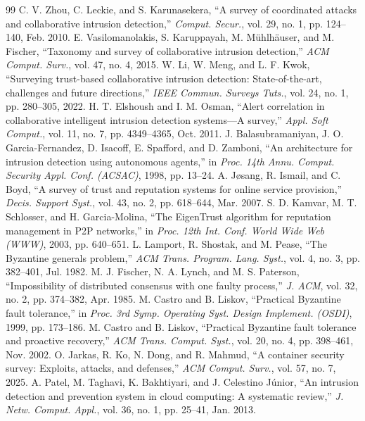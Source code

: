 \documentclass[journal]{IEEEtran}
\begin{document}
\begin{thebibliography}{99}
 C. V. Zhou, C. Leckie, and S. Karunasekera, ``A survey of coordinated attacks and collaborative intrusion detection,'' \emph{Comput. Secur.}, vol. 29, no. 1, pp. 124--140, Feb. 2010.
 E. Vasilomanolakis, S. Karuppayah, M. M{\"u}hlh{\"a}user, and M. Fischer, ``Taxonomy and survey of collaborative intrusion detection,'' \emph{ACM Comput. Surv.}, vol. 47, no. 4, 2015.
 W. Li, W. Meng, and L. F. Kwok, ``Surveying trust-based collaborative intrusion detection: State-of-the-art, challenges and future directions,'' \emph{IEEE Commun. Surveys Tuts.}, vol. 24, no. 1, pp. 280--305, 2022.
 H. T. Elshoush and I. M. Osman, ``Alert correlation in collaborative intelligent intrusion detection systems---A survey,'' \emph{Appl. Soft Comput.}, vol. 11, no. 7, pp. 4349--4365, Oct. 2011.
 J. Balasubramaniyan, J. O. Garcia-Fernandez, D. Isacoff, E. Spafford, and D. Zamboni, ``An architecture for intrusion detection using autonomous agents,'' in \emph{Proc. 14th Annu. Comput. Security Appl. Conf. (ACSAC)}, 1998, pp. 13--24.
 A. J{\o}sang, R. Ismail, and C. Boyd, ``A survey of trust and reputation systems for online service provision,'' \emph{Decis. Support Syst.}, vol. 43, no. 2, pp. 618--644, Mar. 2007.
 S. D. Kamvar, M. T. Schlosser, and H. Garcia-Molina, ``The EigenTrust algorithm for reputation management in P2P networks,'' in \emph{Proc. 12th Int. Conf. World Wide Web (WWW)}, 2003, pp. 640--651.
 L. Lamport, R. Shostak, and M. Pease, ``The Byzantine generals problem,'' \emph{ACM Trans. Program. Lang. Syst.}, vol. 4, no. 3, pp. 382--401, Jul. 1982.
 M. J. Fischer, N. A. Lynch, and M. S. Paterson, ``Impossibility of distributed consensus with one faulty process,'' \emph{J. ACM}, vol. 32, no. 2, pp. 374--382, Apr. 1985.
 M. Castro and B. Liskov, ``Practical Byzantine fault tolerance,'' in \emph{Proc. 3rd Symp. Operating Syst. Design Implement. (OSDI)}, 1999, pp. 173--186.
 M. Castro and B. Liskov, ``Practical Byzantine fault tolerance and proactive recovery,'' \emph{ACM Trans. Comput. Syst.}, vol. 20, no. 4, pp. 398--461, Nov. 2002.
 O. Jarkas, R. Ko, N. Dong, and R. Mahmud, ``A container security survey: Exploits, attacks, and defenses,'' \emph{ACM Comput. Surv.}, vol. 57, no. 7, 2025.
 A. Patel, M. Taghavi, K. Bakhtiyari, and J. Celestino J{\'u}nior, ``An intrusion detection and prevention system in cloud computing: A systematic review,'' \emph{J. Netw. Comput. Appl.}, vol. 36, no. 1, pp. 25--41, Jan. 2013.

\end{thebibliography}
\end{document}
